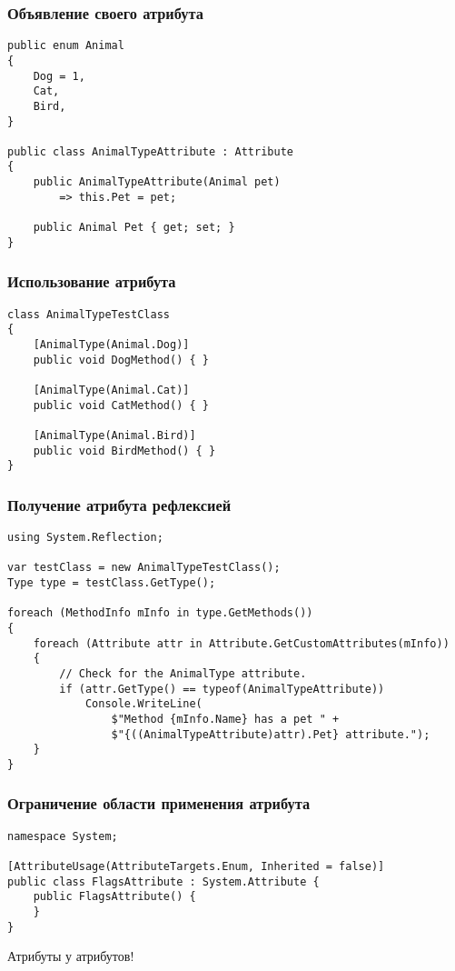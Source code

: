 \documentclass{../../slides-style}
\begin{document}
    \begin{frame}[fragile]
        \frametitle{Объявление своего атрибута}
        \begin{footnotesize}
            \begin{verbatim}
public enum Animal
{
    Dog = 1,
    Cat,
    Bird,
}

public class AnimalTypeAttribute : Attribute
{
    public AnimalTypeAttribute(Animal pet)
        => this.Pet = pet;

    public Animal Pet { get; set; }
}
            \end{verbatim}
        \end{footnotesize}
    \end{frame}

    \begin{frame}[fragile]
        \frametitle{Использование атрибута}
        \begin{verbatim}
class AnimalTypeTestClass
{
    [AnimalType(Animal.Dog)]
    public void DogMethod() { }

    [AnimalType(Animal.Cat)]
    public void CatMethod() { }

    [AnimalType(Animal.Bird)]
    public void BirdMethod() { }
}
        \end{verbatim}
    \end{frame}

    \begin{frame}[fragile]
        \frametitle{Получение атрибута рефлексией}
        \begin{footnotesize}
            \begin{verbatim}
using System.Reflection;

var testClass = new AnimalTypeTestClass();
Type type = testClass.GetType();

foreach (MethodInfo mInfo in type.GetMethods())
{
    foreach (Attribute attr in Attribute.GetCustomAttributes(mInfo))
    {
        // Check for the AnimalType attribute.
        if (attr.GetType() == typeof(AnimalTypeAttribute))
            Console.WriteLine(
                $"Method {mInfo.Name} has a pet " +
                $"{((AnimalTypeAttribute)attr).Pet} attribute.");
    }
}
            \end{verbatim}
        \end{footnotesize}
    \end{frame}

    \begin{frame}[fragile]
        \frametitle{Ограничение области применения атрибута}
        \begin{verbatim}
namespace System;

[AttributeUsage(AttributeTargets.Enum, Inherited = false)]
public class FlagsAttribute : System.Attribute {
    public FlagsAttribute() {
    }
}
        \end{verbatim}
        Атрибуты у атрибутов!
    \end{frame}
\end{document}
